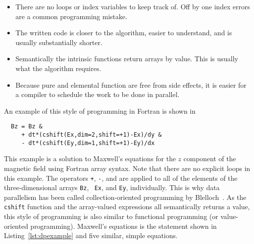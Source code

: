 \begin{itemize}
	\item There are no loops or index variables to keep track of.  Off by one
index errors are a common programming mistake.
        \item The written code is closer to the algorithm, easier to understand, and is usually substantially shorter.
	\item Semantically the intrinsic functions return arrays by value.  This is usually what the algorithm requires.
	\item Because pure and elemental function are free from side effects, it is easier for a compiler to schedule the work to be done in parallel.
\end{itemize}

An example of this style of programming in Fortran is shown in

{\small
\begin{verbatim}
  Bz = Bz &
     + dt*(cshift(Ex,dim=2,shift=+1)-Ex)/dy &
     - dt*(cshift(Ey,dim=1,shift=+1)-Ey)/dx
\end{verbatim}
}

This example is a solution to Maxwell's equations for the $z$ component of the
magnetic field using Fortran array syntax.  Note that there are no explicit
loops in this example.  The operators {\tt +}, {\tt -}, and {\tt *} are
applied to all of the elements of the three-dimensional arrays {\tt Bz}, {\tt
  Ex}, and {\tt Ey}, individually.  This is why data parallelism has been
called collection-oriented programming by
Blelloch~\cite{blelloch90,rajopadhyedidlacs}.  As the {\tt cshift} function
and the array-valued expressions all semantically returns a value, this style
of programming is also similar to functional programming (or value-oriented
programming). %
Maxwell's equations is the statement shown in Listing~\ref{lst:dpexample} and
five similar, simple equations.


